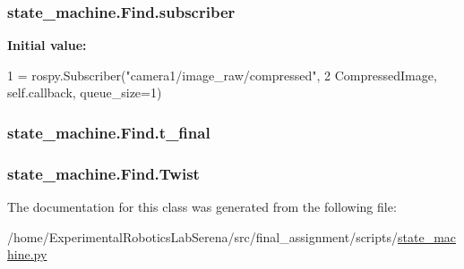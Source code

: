 \subsubsection[{\texorpdfstring{subscriber}{subscriber}}]{\setlength{\rightskip}{0pt plus 5cm}state\+\_\+machine.\+Find.\+subscriber\hspace{0.3cm}{\ttfamily [static]}}\hypertarget{classstate__machine_1_1Find_ab9bfce719b158c4f931736443eac806d}{}\label{classstate__machine_1_1Find_ab9bfce719b158c4f931736443eac806d}
{\bfseries Initial value\+:}
\begin{DoxyCode}
1 = rospy.Subscriber(\textcolor{stringliteral}{"camera1/image\_raw/compressed"},
2                                               CompressedImage, self.callback,  queue\_size=1)
\end{DoxyCode}
\subsubsection[{\texorpdfstring{t\+\_\+final}{t_final}}]{\setlength{\rightskip}{0pt plus 5cm}state\+\_\+machine.\+Find.\+t\+\_\+final\hspace{0.3cm}{\ttfamily [static]}}\hypertarget{classstate__machine_1_1Find_ad284228602a30b744143e35e03e938ce}{}\label{classstate__machine_1_1Find_ad284228602a30b744143e35e03e938ce}
\subsubsection[{\texorpdfstring{Twist}{Twist}}]{\setlength{\rightskip}{0pt plus 5cm}state\+\_\+machine.\+Find.\+Twist\hspace{0.3cm}{\ttfamily [static]}}\hypertarget{classstate__machine_1_1Find_ad0300ceff8872223de0bc6ebf8484070}{}\label{classstate__machine_1_1Find_ad0300ceff8872223de0bc6ebf8484070}


The documentation for this class was generated from the following file\+:\begin{DoxyCompactItemize}
\item 
/home/\+Experimental\+Robotics\+Lab\+Serena/src/final\+\_\+assignment/scripts/\hyperlink{state__machine_8py}{state\+\_\+machine.\+py}\end{DoxyCompactItemize}
